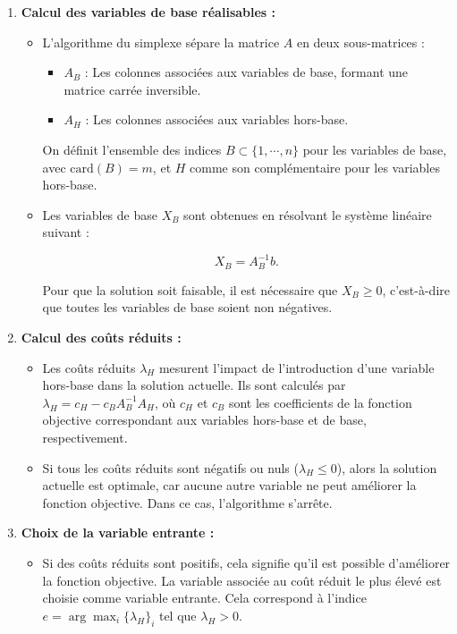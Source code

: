 \documentclass[12pt]{article}
\begin{document}
\begin{enumerate}
    \item \textbf{Calcul des variables de base réalisables :} 
    \begin{itemize}
        \item L'algorithme du simplexe sépare la matrice \( A \) en deux sous-matrices :
        \begin{itemize}
            \item \( A_B \) : Les colonnes associées aux variables de base, formant une matrice carrée inversible.
            \item \( A_H \) : Les colonnes associées aux variables hors-base.
        \end{itemize}
        
        On définit l'ensemble des indices \( B \subset \{1, \cdots, n\} \) pour les variables de base, avec \( \text{card}(B) = m \), et \( H \) comme son complémentaire pour les variables hors-base.
    
        \item Les variables de base \( X_B \) sont obtenues en résolvant le système linéaire suivant :
        
        \[
        X_B = A_B^{-1}b.
        \]
        
        Pour que la solution soit faisable, il est nécessaire que \( X_B \geq 0 \), c'est-à-dire que toutes les variables de base soient non négatives.
    \end{itemize}


    \item \textbf{Calcul des coûts réduits :} 
    \begin{itemize}
        \item Les coûts réduits \(\lambda_H\) mesurent l'impact de l'introduction d'une variable hors-base dans la solution actuelle. Ils sont calculés par \( \lambda_H = c_H - c_B A_B^{-1} A_H \), où \( c_H \) et \( c_B \) sont les coefficients de la fonction objective correspondant aux variables hors-base et de base, respectivement.
        \item Si tous les coûts réduits sont négatifs ou nuls (\( \lambda_H \leq 0 \)), alors la solution actuelle est optimale, car aucune autre variable ne peut améliorer la fonction objective. Dans ce cas, l'algorithme s'arrête.
    \end{itemize}

    \item \textbf{Choix de la variable entrante :}
    \begin{itemize}
        \item Si des coûts réduits sont positifs, cela signifie qu'il est possible d'améliorer la fonction objective. La variable associée au coût réduit le plus élevé est choisie comme variable entrante. Cela correspond à l'indice \( e = \arg\max_i \{ \lambda_H \}_i \) tel que \( \lambda_H > 0 \).
    \end{itemize}


\end{enumerate}
\end{document}
